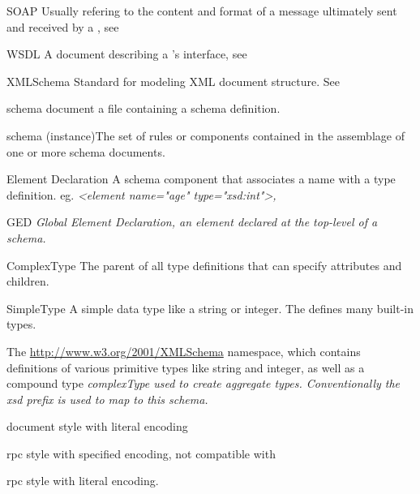 \begin{definitions}
\item{SOAP \newline Usually refering to the content and format of a message ultimately
sent and received by a \WS{}, see \SOAP{}}
\item{WSDL \newline A document describing a \WS{}'s interface, see
\WSDL{}}
\item{XMLSchema \newline Standard for modeling XML document
structure.  See \XMLSchema{}}
\item {schema document \newline a file containing a schema definition.}
\item {schema (instance)\newline The set of rules or components contained in the
assemblage of one or more schema documents.} 
\item{Element Declaration \newline A schema component that associates a
name with a type definition.  eg. \it{<element name="age" type="xsd:int">}, }
\item{GED \newline \it{Global Element Declaration}, an element declared at the
top-level of a schema.}
\item{ComplexType \newline The parent of all type definitions that can
specify attributes and children.}
\item{SimpleType \newline A simple data type like a string or integer.  The
\XMLSchema{} defines many built-in types. }
\item{\XSD \newline The \url{http://www.w3.org/2001/XMLSchema} namespace, which
contains definitions of various primitive types like string and integer, as well
as a compound type \it{complexType} used to create aggregate types.  
Conventionally the \emph{xsd} prefix is used to map to this schema.}
\item{\DOCLIT\newline document style with literal encoding}
\item{\RPCENC\newline rpc style with specified encoding, not compatible with
\WSI}
\item{\RPCLIT\newline rpc style with literal encoding.}
\end{definitions}

